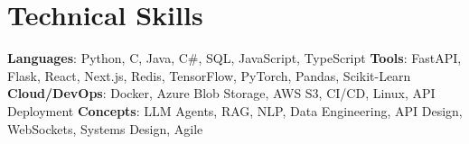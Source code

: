 

\section{Technical Skills}
\begin{itemize}[leftmargin=0.15in, label={}]
    \small{\item{
        \textbf{Languages}{: Python, C, Java, C\#, SQL, JavaScript, TypeScript}
        \textbf{Tools}{: FastAPI, Flask, React, Next.js, Redis, TensorFlow, PyTorch, Pandas, Scikit-Learn}
        \textbf{Cloud/DevOps}{: Docker, Azure Blob Storage, AWS S3, CI/CD, Linux, API Deployment}
        \textbf{Concepts}{: LLM Agents, RAG, NLP, Data Engineering, API Design, WebSockets, Systems Design, Agile}
    }}
\end{itemize}
